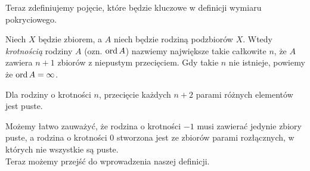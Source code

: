 Teraz zdefiniujemy pojęcie, które będzie kluczowe w definicji wymiaru pokryciowego.
\begin{defi}
    Niech $X$ będzie zbiorem, a $A$ niech będzie rodziną podzbiorów $X$. Wtedy \emph{krotnością} rodziny $A$ (ozn. $\operatorname{ord} A$) nazwiemy największe takie całkowite $n$, że $A$ zawiera $n+1$ zbiorów z niepustym przecięciem. Gdy takie $n$ nie istnieje, powiemy że $\operatorname{ord} A=\infty$.  
\end{defi}
\begin{wnio}
    Dla rodziny o krotności $n$, przecięcie każdych $n+2$ parami różnych elementów jest puste.
\end{wnio}
Możemy łatwo zauważyć, że rodzina o krotności $-1$ musi zawierać jedynie zbiory puste, a rodzina o krotności 0 stworzona jest ze zbiorów parami rozłącznych, w których nie wszystkie są puste.
\\
Teraz możemy przejść do wprowadzenia naszej definicji.

